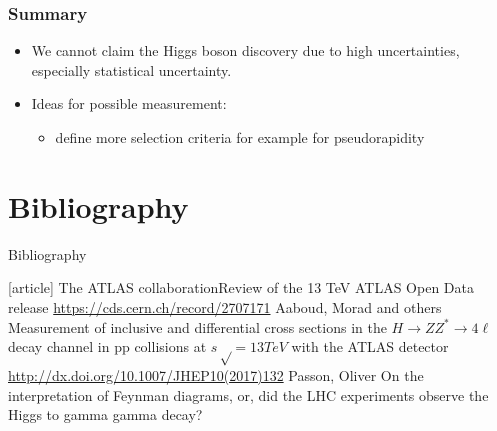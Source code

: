 \documentclass[aspectratio=1610, english]{beamer}
\newcommand{\hzz}{ H\rightarrow ZZ^{*}\rightarrow 4 \ell}
\begin{document}
\begin{frame}

\frametitle{Summary}
\begin{itemize}

\item We cannot claim the Higgs boson discovery due to high uncertainties, especially statistical uncertainty. \\[1cm]

\item Ideas for possible measurement:
	\begin{itemize}
	\item define more selection criteria for example for pseudorapidity
	\end{itemize}

\end{itemize}

\end{frame}

\section{Bibliography}
\begin{frame}[allowframebreaks]{Bibliography}
\begin{thebibliography}{9}
		[article]
			{The ATLAS collaboration\newblock Review of the 13 TeV ATLAS Open Data release \newblock \url{https://cds.cern.ch/record/2707171}}
			{Aaboud, Morad and others \newblock Measurement of inclusive and differential cross sections in the $ \hzz $ decay channel in pp collisions at $s√ = 13 TeV$ with the ATLAS detector \newblock \url{http://dx.doi.org/10.1007/JHEP10(2017)132}}
			{Passon, Oliver \newblock On the interpretation of Feynman diagrams, or, did the LHC experiments observe the Higgs to gamma gamma decay?}
\end{thebibliography}
\end{frame}
\end{document}
